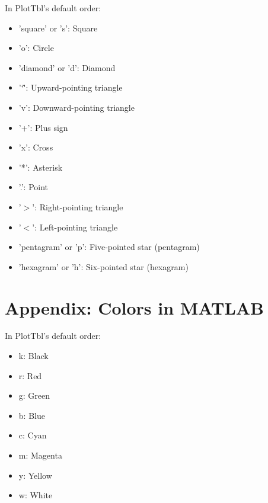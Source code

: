 \documentclass{article}
\newcommand{\caret}{\char`\^}
\begin{document}
In PlotTbl's default order:

\begin{itemize}
\item 'square' or 's': Square
\item 'o': Circle
\item 'diamond' or 'd': Diamond
\item '\caret': Upward-pointing triangle
\item 'v': Downward-pointing triangle
\item '+': Plus sign
\item 'x': Cross
\item '*': Asterisk
\item '.': Point
\item '$>$': Right-pointing triangle
\item '$<$': Left-pointing triangle
\item 'pentagram' or 'p': Five-pointed star (pentagram)
\item 'hexagram' or 'h': Six-pointed star (hexagram)
\end{itemize}

\section{Appendix: Colors in MATLAB}

In PlotTbl's default order:

\begin{itemize}
\item k: Black
\item r: Red
\item g: Green
\item b: Blue
\item c: Cyan
\item m: Magenta
\item y: Yellow
\item w: White
\end{itemize}
\end{document}
